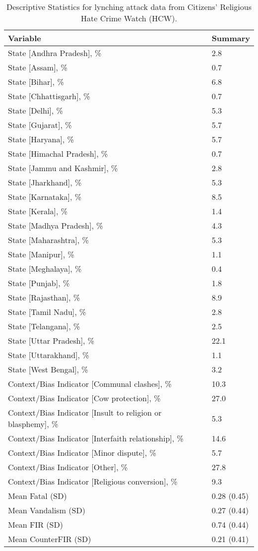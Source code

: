 \begin{table}

\caption{Descriptive Statistics for lynching attack data from Citizens' Religious Hate Crime Watch (HCW).}
\centering
\begin{tabular}[t]{l|l}
\hline
Variable & Summary\\
\hline
State [Andhra Pradesh], \% & 2.8\\
\hline
State [Assam], \% & 0.7\\
\hline
State [Bihar], \% & 6.8\\
\hline
State [Chhattisgarh], \% & 0.7\\
\hline
State [Delhi], \% & 5.3\\
\hline
State [Gujarat], \% & 5.7\\
\hline
State [Haryana], \% & 5.7\\
\hline
State [Himachal Pradesh], \% & 0.7\\
\hline
State [Jammu and Kashmir], \% & 2.8\\
\hline
State [Jharkhand], \% & 5.3\\
\hline
State [Karnataka], \% & 8.5\\
\hline
State [Kerala], \% & 1.4\\
\hline
State [Madhya Pradesh], \% & 4.3\\
\hline
State [Maharashtra], \% & 5.3\\
\hline
State [Manipur], \% & 1.1\\
\hline
State [Meghalaya], \% & 0.4\\
\hline
State [Punjab], \% & 1.8\\
\hline
State [Rajasthan], \% & 8.9\\
\hline
State [Tamil Nadu], \% & 2.8\\
\hline
State [Telangana], \% & 2.5\\
\hline
State [Uttar Pradesh], \% & 22.1\\
\hline
State [Uttarakhand], \% & 1.1\\
\hline
State [West Bengal], \% & 3.2\\
\hline
Context/Bias Indicator [Communal clashes], \% & 10.3\\
\hline
Context/Bias Indicator [Cow protection], \% & 27.0\\
\hline
Context/Bias Indicator [Insult to religion or blasphemy], \% & 5.3\\
\hline
Context/Bias Indicator [Interfaith relationship], \% & 14.6\\
\hline
Context/Bias Indicator [Minor dispute], \% & 5.7\\
\hline
Context/Bias Indicator [Other], \% & 27.8\\
\hline
Context/Bias Indicator [Religious conversion], \% & 9.3\\
\hline
Mean Fatal (SD) & 0.28 (0.45)\\
\hline
Mean Vandalism (SD) & 0.27 (0.44)\\
\hline
Mean FIR (SD) & 0.74 (0.44)\\
\hline
Mean CounterFIR (SD) & 0.21 (0.41)\\
\hline
\end{tabular}
\end{table}
